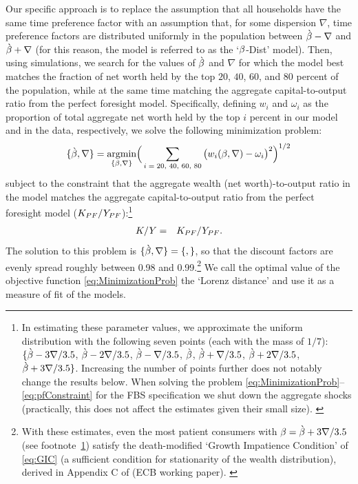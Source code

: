 \documentclass[12pt,titlepage]{econtex}
\begin{document}
Our specific approach is to replace the assumption that all households have the same time
preference factor with an assumption that, for some dispersion $\nabla$, time
preference factors are distributed uniformly in the population between
$\grave{\Discount}-\nabla$ and $\grave{\Discount}+\nabla$ (for this reason, the model is referred to as the `$\Discount$-Dist' model).  Then,
using simulations, we search for the values of $\grave{\Discount}$ and
$\nabla$ for which the model best matches the fraction of net worth held by the top $20$, $40$, $60$, and $80$ percent of the population, while at the same time matching
the aggregate capital-to-output ratio from the perfect foresight
model. Specifically, defining $w_{i}$ and $\omega _{i}$ as the proportion of total aggregate net worth held by the top $i$ percent in our model and in the data, respectively, we solve the following minimization problem:
\begin{equation}
\{\grave{\beta}, \nabla\}= \underset{\{{\beta}, \nabla\}}{\text{argmin} }\Big(\sum_\text{$i=20$, $40$, $60$, $80$}
\big(w_{i}({\beta}, \nabla)-\omega _{i}\big)^{2}\Big)^{1/2} \label{eq:MinimizationProb}
\end{equation}
subject to the constraint that the aggregate wealth (net worth)-to-output ratio in the model matches the aggregate
capital-to-output ratio from the perfect foresight model ($\KLev_{PF}/\YLev_{PF}$):\footnote{In estimating these parameter values, we approximate the uniform distribution with the following seven points (each with the mass of $1/7$): $\{\grave{\Discount}-3\nabla/3.5$, $\grave{\Discount}-2\nabla/3.5$, $\grave{\Discount}-\nabla/3.5$, $\grave{\Discount}$, $\grave{\Discount}+\nabla/3.5$, $\grave{\Discount}+2\nabla/3.5$, $\grave{\Discount}+3\nabla/3.5\}$. Increasing the number of points further does not notably change the results below. When solving the problem \eqref{eq:MinimizationProb}--\eqref{eq:pfConstraint} for the FBS specification we shut down the aggregate shocks (practically, this does not affect the estimates given their small size).
\label{foot:uniApprox}}
\begin{eqnarray}
K/Y & = & K_{PF}/Y_{PF}.  \label{eq:pfConstraint}
\end{eqnarray}
The solution to this problem is $\{\grave{\Discount}, \nabla\}=\{

,

\}$, so that the discount factors are evenly spread roughly between 0.98 and 0.99.\footnote{With these estimates, even the most patient consumers with $\Discount=\grave{\Discount}+3\nabla/3.5$ (see footnote~\ref{foot:uniApprox}) satisfy the death-modified `Growth Impatience Condition' of \eqref{eq:GIC} (a sufficient condition for stationarity of the wealth distribution), derived in Appendix C of \citet{cstKS} (ECB working paper). \label{foot:DMGIC} } We call the optimal value of the objective function \eqref{eq:MinimizationProb} the `Lorenz distance' and use it as a measure of fit of the models.
\end{document}

